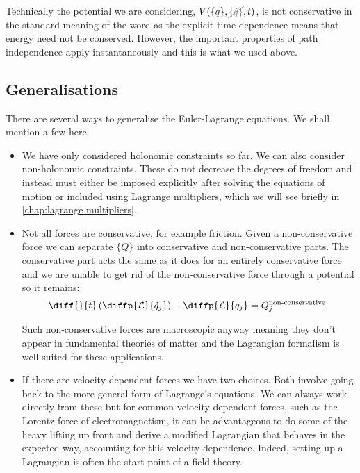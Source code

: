 \documentclass[fleqn]{NotesClass}
\newcommand*{\nodependence}[1]{\textcolor{gray}{\cancel{#1}}}
\newcommand*{\lagrangian}{\mathcal{L}}
\begin{document}
    Technically the potential we are considering, \(V(\{q\}, \nodependence{\{\dot{q}\}}, t)\), is not conservative in the standard meaning of the word as the explicit time dependence means that energy need not be conserved.
    However, the important properties of path independence apply instantaneously and this is what we used above.
    
    \subsection{Generalisations}
    There are several ways to generalise the Euler-Lagrange equations.
    We shall mention a few here.
    \begin{itemize}
        \item We have only considered holonomic constraints so far.
        We can also consider non-holonomic constraints.
        These do not decrease the degrees of freedom and instead must either be imposed explicitly after solving the equations of motion or included using Lagrange multipliers, which we will see briefly in \cref{chap:lagrange multipliers}.
        
        \item Not all forces are conservative, for example friction.
        Given a non-conservative force we can separate \(\{Q\}\) into conservative and non-conservative parts.
        The conservative part acts the same as it does for an entirely conservative force and we are unable to get rid of the non-conservative force through a potential so it remains:
        \begin{equation}
            \diff{}{t}\left( \diffp{\lagrangian}{\dot{q}_j} \right) - \diffp{\lagrangian}{q_j} = Q_j^{\text{non-conservative}}.
        \end{equation}
        
        Such non-conservative forces are macroscopic anyway meaning they don't appear in fundamental theories of matter and the Lagrangian formalism is well suited for these applications.
        
        \item If there are velocity dependent forces we have two choices.
        Both involve going back to the more general form of Lagrange's equations.
        We can always work directly from these but for common velocity dependent forces, such as the Lorentz force of electromagnetism, it can be advantageous to do some of the heavy lifting up front and derive a modified Lagrangian that behaves in the expected way, accounting for this velocity dependence.
        Indeed, setting up a Lagrangian is often the start point of a field theory.
    \end{itemize}
    
\end{document}
